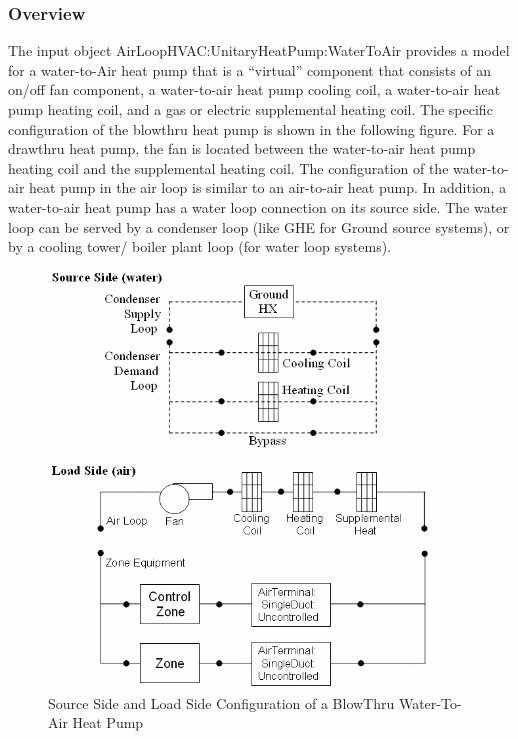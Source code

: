 \subsubsection{Overview}\label{overview-8}

The input object AirLoopHVAC:UnitaryHeatPump:WaterToAir provides a model for a water-to-Air heat pump that is a ``virtual'' component that consists of an on/off fan component, a water-to-air heat pump cooling coil, a water-to-air heat pump heating coil, and a gas or electric supplemental heating coil. The specific configuration of the blowthru heat pump is shown in the following figure. For a drawthru heat pump, the fan is located between the water-to-air heat pump heating coil and the supplemental heating coil. The configuration of the water-to-air heat pump in the air loop is similar to an air-to-air heat pump. In addition, a water-to-air heat pump has a water loop connection on its source side. The water loop can be served by a condenser loop (like GHE for Ground source systems), or by a cooling tower/ boiler plant loop (for water loop systems).

\begin{figure}[hbtp] %
\centering
\includegraphics[width=0.9\textwidth, height=0.9\textheight, keepaspectratio=true]{media/image5222.png}
\caption{Source Side and Load Side Configuration of a BlowThru Water-To-Air Heat Pump \protect \label{fig:source-side-and-load-side-configuration-of-a}}
\end{figure}

